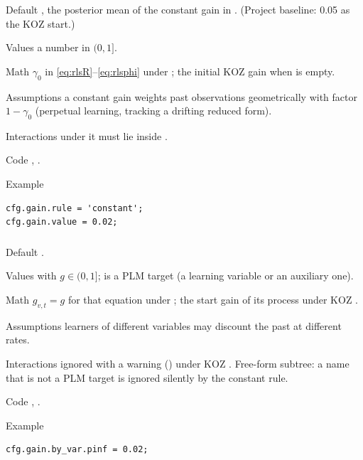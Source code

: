 \documentclass[11pt,a4paper]{article}
\DeclareRobustCommand{\codem}[1]{\texttt{\detokenize{#1}}}
\newenvironment{optspec}%
  {\begin{description}[style=sameline,leftmargin=2.7cm,labelwidth=2.5cm,font=\normalfont\itshape]}%
  {\end{description}}
\begin{document}
\subsubsection{\texorpdfstring{\codem{gain.value}}{gain.value}}\label{opt:gain-value}
\begin{optspec}
  \item[Default] , the posterior mean of the constant gain in
        \citet[Table~1]{ozden2025}. (Project baseline: 0.05 as the KOZ start.)
  \item[Values] a number in $(0, 1]$.
  \item[Math] $\gamma_0$ in \eqref{eq:rlsR}--\eqref{eq:rlsphi} under ; the
        initial KOZ gain when  is empty.
  \item[Assumptions] a constant gain weights past observations geometrically with factor
        $1-\gamma_0$ (perpetual learning, tracking a drifting reduced form).
  \item[Interactions] under  it must lie inside .
  \item[Code] , .
  \item[Example]
\begin{lstlisting}
cfg.gain.rule = 'constant';
cfg.gain.value = 0.02;
\end{lstlisting}
\end{optspec}

\subsubsection{\texorpdfstring{\codem{gain.by_var}}{gain.by\_var}}\label{opt:gain-by-var}
\begin{optspec}
  \item[Default] .
  \item[Values]  with $g\in(0,1]$;  is a PLM target
        (a learning variable or an auxiliary one).
  \item[Math] $g_{v,t} = g$ for that equation under ; the start gain of its
        process under KOZ .
  \item[Assumptions] learners of different variables may discount the past at different rates.
  \item[Interactions] ignored with a warning () under KOZ
        . Free-form subtree: a name that is not a PLM target is ignored silently
        by the constant rule.
  \item[Code] , .
  \item[Example]
\begin{lstlisting}
cfg.gain.by_var.pinf = 0.02;
\end{lstlisting}
\end{optspec}
\end{document}
